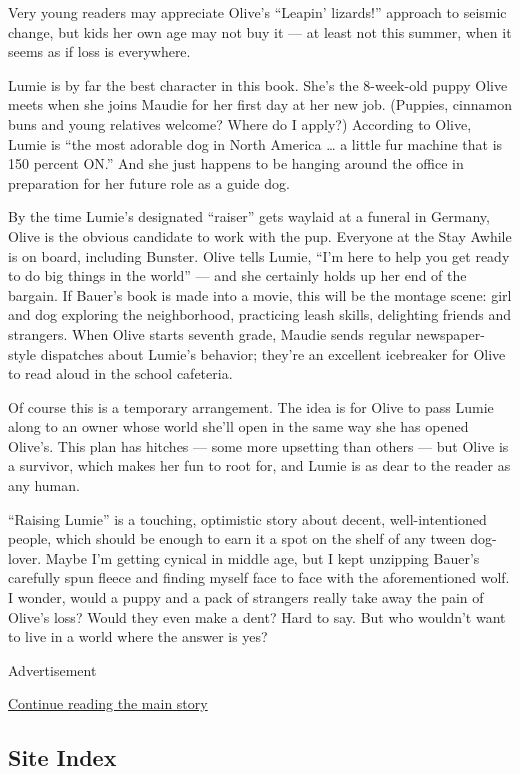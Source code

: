 Very young readers may appreciate Olive's ``Leapin' lizards!'' approach
to seismic change, but kids her own age may not buy it --- at least not
this summer, when it seems as if loss is everywhere.

Lumie is by far the best character in this book. She's the 8-week-old
puppy Olive meets when she joins Maudie for her first day at her new
job. (Puppies, cinnamon buns and young relatives welcome? Where do I
apply?) According to Olive, Lumie is ``the most adorable dog in North
America \ldots{} a little fur machine that is 150 percent ON.'' And she
just happens to be hanging around the office in preparation for her
future role as a guide dog.

By the time Lumie's designated ``raiser'' gets waylaid at a funeral in
Germany, Olive is the obvious candidate to work with the pup. Everyone
at the Stay Awhile is on board, including Bunster. Olive tells Lumie,
``I'm here to help you get ready to do big things in the world'' --- and
she certainly holds up her end of the bargain. If Bauer's book is made
into a movie, this will be the montage scene: girl and dog exploring the
neighborhood, practicing leash skills, delighting friends and strangers.
When Olive starts seventh grade, Maudie sends regular newspaper-style
dispatches about Lumie's behavior; they're an excellent icebreaker for
Olive to read aloud in the school cafeteria.

Of course this is a temporary arrangement. The idea is for Olive to pass
Lumie along to an owner whose world she'll open in the same way she has
opened Olive's. This plan has hitches --- some more upsetting than
others --- but Olive is a survivor, which makes her fun to root for, and
Lumie is as dear to the reader as any human.

``Raising Lumie'' is a touching, optimistic story about decent,
well-intentioned people, which should be enough to earn it a spot on the
shelf of any tween dog-lover. Maybe I'm getting cynical in middle age,
but I kept unzipping Bauer's carefully spun fleece and finding myself
face to face with the aforementioned wolf. I wonder, would a puppy and a
pack of strangers really take away the pain of Olive's loss? Would they
even make a dent? Hard to say. But who wouldn't want to live in a world
where the answer is yes?

Advertisement

\protect\hyperlink{after-bottom}{Continue reading the main story}

\hypertarget{site-index}{%
\subsection{Site Index}\label{site-index}}


